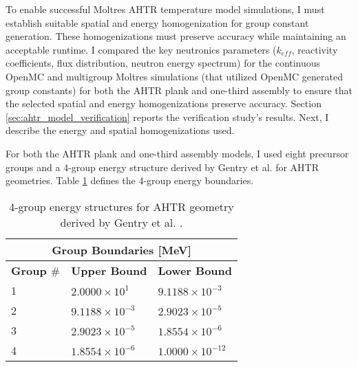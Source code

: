 To enable successful Moltres \gls{AHTR} temperature model simulations, I must 
establish suitable spatial and energy homogenization for group constant generation. 
These homogenizations must preserve accuracy while maintaining an acceptable runtime.
I compared the key neutronics parameters ($k_{eff}$, reactivity coefficients, 
flux distribution, neutron energy spectrum) for the continuous OpenMC and multigroup 
Moltres simulations (that utilized OpenMC generated group constants) for both the 
\gls{AHTR} plank and one-third assembly to ensure that the selected spatial and energy 
homogenizations preserve accuracy.
Section \ref{sec:ahtr_model_verification} reports the verification study's results.
Next, I describe the energy and spatial homogenizations used. 

For both the \gls{AHTR} plank and one-third assembly models, I used eight precursor 
groups and a 4-group energy structure derived by Gentry et al. 
\cite{gentry_development_2016} for \gls{AHTR} geometries. 
Table \ref{tab:energy_structures} defines the 4-group energy boundaries. 
\begin{table}[htbp]
    \centering
    \onehalfspacing
    \caption{4-group energy structures for \acrfull{AHTR} geometry 
    derived by Gentry et al. \cite{gentry_development_2016}.}
	\label{tab:energy_structures}
    \footnotesize
    \begin{tabular}{lll}
    \hline
    \multicolumn{3}{c}{\textbf{Group Boundaries [MeV]}} \\ 
    \hline
    \textbf{Group $\#$}& \textbf{Upper Bound} & \textbf{Lower Bound}  \\
    \hline 
    1 & $2.0000\times 10^1$ & $9.1188\times 10^{-3}$ \\ 
    2 & $9.1188\times 10^{-3}$ & $2.9023\times 10^{-5}$\\
    3 & $2.9023\times 10^{-5}$ & $1.8554\times 10^{-6}$\\
    4 & $1.8554\times 10^{-6}$ & $1.0000\times 10^{-12}$\\
    \hline
    \end{tabular}
\end{table}

